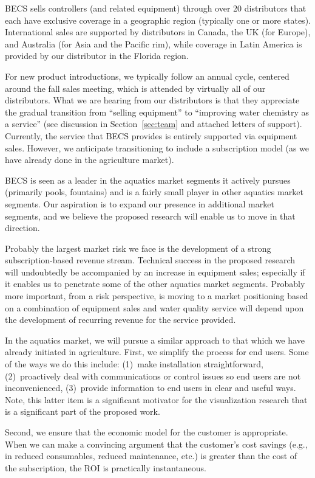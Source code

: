 BECS sells controllers (and related equipment) through over 20
distributors that each have exclusive coverage in a geographic region
(typically one or more states).
International sales are supported by distributors in Canada,
the UK (for Europe), and Australia (for Asia and the Pacific rim),
while coverage in Latin America is provided by our distributor in the
Florida region.

For new product introductions, we typically follow an annual cycle,
centered around the fall sales meeting, which is attended by virtually
all of our distributors.  What we are hearing from our distributors
is that they appreciate the gradual transition from ``selling equipment''
to ``improving water chemistry as a service'' (see discussion in
Section~\ref{sec:team} and attached letters of support).
Currently, the service that BECS provides is entirely supported via
equipment sales.  However, we anticipate transitioning to include a
subscription model (as we have already done in the agriculture market).

BECS is seen as a leader in the aquatics market segments it actively pursues
(primarily pools, fountains) and is a fairly small player in other
aquatics market segments.  Our aspiration is to expand our presence
in additional market
segments, and we believe the proposed research will enable us to move
in that direction.

Probably the largest market risk we face is the development of a strong
subscription-based revenue stream.  Technical success in the proposed
research will undoubtedly be accompanied by an increase in equipment sales;
especially if it enables us to penetrate some of the other aquatics
market segments.  Probably more important, from a risk perspective,
is moving to a
market positioning based on a combination of equipment sales and
water quality service will depend upon the development of recurring
revenue for the service provided.

In the aquatics market, we will pursue a similar approach to that which
we have already initiated in agriculture. First, we simplify the process
for end users. Some of the ways we do this include:
(1)~make installation straightforward,
(2)~proactively deal with communications or control issues so end users are not
inconvenienced,
(3)~provide information to end users in clear and useful ways.
Note, this latter item is a significant motivator for the visualization
research that is a significant part of the proposed work.

Second, we ensure that the economic model for the customer is appropriate.
When we can make a convincing argument that the customer's cost savings
(e.g., in reduced consumables, reduced maintenance, etc.) is greater than
the cost of the subscription, the ROI is practically instantaneous.

